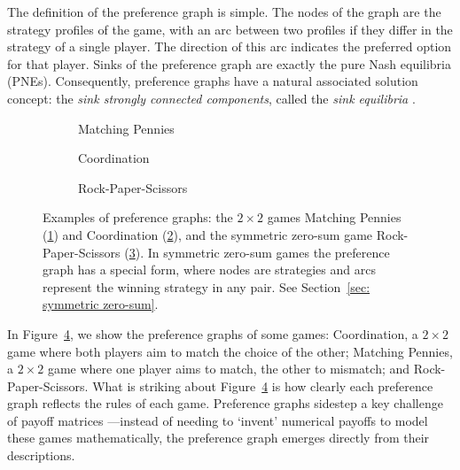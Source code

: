 \documentclass[preprint,authoryear]{elsarticle}
\begin{document}


The definition of the preference graph is simple. The nodes of the graph are the strategy profiles of the game, with an arc between two profiles if they differ in the strategy of a single player. The direction of this arc indicates the preferred option for that player. Sinks of the preference graph are exactly the pure Nash equilibria (PNEs). Consequently, preference graphs have a natural associated solution concept: the \emph{sink strongly connected components}, called the \emph{sink equilibria} \citep{goemans_sink_2005,papadimitriou_game_2019,biggar_graph_2023}.

\begin{figure}[h]
    \centering
    \begin{subfigure}{.3\textwidth}
        \centering
        
        \caption{Matching Pennies}
        \label{fig:MP 1}
    \end{subfigure}
    \quad
    \begin{subfigure}{.3\textwidth}
        \centering
        
        \caption{Coordination}
        \label{fig:CO 1}
    \end{subfigure}
    \quad
    \begin{subfigure}{.3\textwidth}
        \centering
        
        \caption{Rock-Paper-Scissors}
        \label{fig: RPS 1}
    \end{subfigure}
    \caption{Examples of preference graphs: the $2\times 2$ games Matching Pennies (\ref{fig:MP 1}) and Coordination (\ref{fig:CO 1}), and the symmetric zero-sum game Rock-Paper-Scissors (\ref{fig: RPS 1}). In symmetric zero-sum games the preference graph has a special form, where nodes are strategies and arcs represent the winning strategy in any pair. See Section~\ref{sec: symmetric zero-sum}.}
    \label{fig:examples}
\end{figure}

In Figure~\ref{fig:examples}, we show the preference graphs of some games: Coordination, a $2\times 2$ game where both players aim to match the choice of the other; Matching Pennies, a $2\times 2$ game where one player aims to match, the other to mismatch; and Rock-Paper-Scissors. What is striking about Figure~\ref{fig:examples} is how clearly each preference graph reflects the rules of each game. Preference graphs sidestep a key challenge of payoff matrices \citep{von2007theory}---instead of needing to `invent' numerical payoffs to model these games mathematically, the preference graph emerges directly from their descriptions. 
\end{document}
